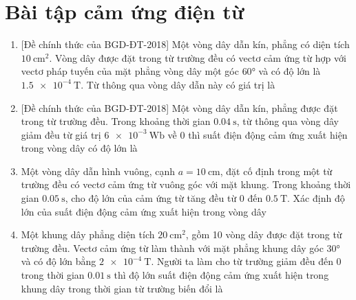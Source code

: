 \section{Bài tập cảm ứng điện từ}
\begin{enumerate}
	\item
	{
		[Đề chính thức của BGD-ĐT-2018] Một vòng dây dẫn kín, phẳng có diện tích $\SI{10}{\centi \meter \squared}$. Vòng dây được đặt trong từ trường đều có vectơ cảm ứng từ hợp với vectơ pháp tuyến của mặt phẳng vòng dây một góc $\ang{60}$ và có độ lớn là $\SI{1.5e-4}{\tesla}$. Từ thông qua vòng dây dẫn này có giá trị là
	}
	\item
	{
		[Đề chính thức của BGD-ĐT-2018] Một vòng dây dẫn kín, phẳng được đặt trong từ trường đều. Trong khoảng thời gian $\SI{0.04}{\second}$, từ thông qua vòng dây giảm đều từ giá trị $\SI{6e-3}{\weber}$ về $0$ thì suất điện động cảm ứng xuất hiện trong vòng dây có độ lớn là
	}
	\item
	{
		Một vòng dây dẫn hình vuông, cạnh $a=\SI{10}{\centi \meter}$, đặt cố định trong một từ trường đều có vectơ cảm ứng từ vuông góc với mặt khung. Trong khoảng thời gian $\SI{0.05}{\second}$, cho độ lớn của cảm ứng từ tăng đều từ $0$ đến $\SI{0.5}{\tesla}$. Xác định độ lớn của suất điện động cảm ứng xuất hiện trong vòng dây
	}
	\item
	{
		Một khung dây phẳng diện tích $\SI{20}{\centi \meter \squared}$, gồm 10 vòng dây được đặt trong từ trường đều. Vectơ cảm ứng từ làm thành với mặt phẳng khung dây góc $\ang{30}$ và có độ lớn bằng $\SI{2e-4}{\tesla}$. Người ta làm cho từ trường giảm đều đến 0 trong thời gian $\SI{0.01}{\second}$ thì độ lớn suất điện động cảm ứng xuất hiện trong khung dây trong thời gian từ trường biến đổi là
}
\end{enumerate}
